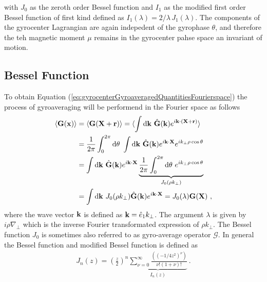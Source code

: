 with $J_0$ as the zeroth order Bessel function and $I_1$ as the modified first order Bessel function of first kind defined as $I_1(\lambda) = 2/\lambda \, J_1(\lambda)$.
The components of the gyrocenter Lagrangian are again indepedent of the gyrophase $\theta$, and therefore the teh magnetic moment $\mu$ remains in the gyrocenter pahse space an invariant of motion.

\newpage
\subsection{Bessel Function}
\label{sub:Besselfunction}

To obtain Equation (\ref{eq:gyrocenterGyroaveragedQuantitiesFourierspace}) the process of gyroaveraging will be performend in the Fourier space as follows
\begin{gather}
    \begin{aligned}
        \langle \boldsymbol{\mathbf{G}}(\boldsymbol{\mathbf{x}}) \rangle &= \langle \boldsymbol{\mathbf{G}}(\boldsymbol{\mathbf{X}} + \boldsymbol{\mathbf{r}}) \rangle = \langle \int \mathrm{d}\boldsymbol{\mathbf{k}} ~ \hat{\boldsymbol{\mathbf{G}}}(\boldsymbol{\mathbf{k}}) e^{i \boldsymbol{\mathbf{k}} \cdot (\boldsymbol{\mathbf{X}} + \boldsymbol{\mathbf{r}})} \rangle \\
                                     &= \frac{1}{2\pi} \int_{0}^{2\pi} \mathrm{d}\theta ~ \int \mathrm{d}\boldsymbol{\mathbf{k}} ~ \hat{\boldsymbol{\mathbf{G}}}(\boldsymbol{\mathbf{k}}) e^{i \boldsymbol{\mathbf{k}} \cdot \boldsymbol{\mathbf{X}}} e^{ i k_\perp \rho \cos \theta} \\
                                     &= \int \mathrm{d}\boldsymbol{\mathbf{k}} ~ \hat{\boldsymbol{\mathbf{G}}}(\boldsymbol{\mathbf{k}}) e^{i \boldsymbol{\mathbf{k}} \cdot \boldsymbol{\mathbf{X}}} \underbrace{\frac{1}{2\pi} \int_{0}^{2\pi} \mathrm{d}\theta ~ e^{ i k_\perp \rho \cos \theta}}_{J_0(\rho k_\perp)}\\
                                     &= \int \mathrm{d}\boldsymbol{\mathbf{k}} ~ J_0(\rho k_\perp) \hat{\boldsymbol{\mathbf{G}}}(\boldsymbol{\mathbf{k}}) e^{i \boldsymbol{\mathbf{k}} \cdot \boldsymbol{\mathbf{X}}} = J_0(\lambda) \boldsymbol{\mathbf{G}}(\boldsymbol{\mathbf{X}})~,
    \end{aligned}
    \label{eq:gyroOperator}
\end{gather}
where the wave vector $\boldsymbol{\mathbf{k}}$ is defined as $\boldsymbol{\mathbf{k}} = \hat{e}_1 k_\perp$. The argument $\lambda$ is given by $i \rho \nabla_{\!\perp}$ which is the inverse Fourier transformated expression of $\rho k_\perp$. The Bessel function $J_0$ is sometimes also referred to as gyro-average operator $\mathcal{G}$. In general the Bessel function and modified Bessel function is defined as \source
\begin{gather}
    J_n(z) = \left(\frac{z}{2}\right)^n \underbrace{\sum^{\infty}_{\nu = 0} \frac{(\left(- 1/4 z^2\right)^\nu)}{\nu! (1 + \nu) !}}_{I_n(z)}~.
    \label{eq:Besselfunction}
\end{gather}